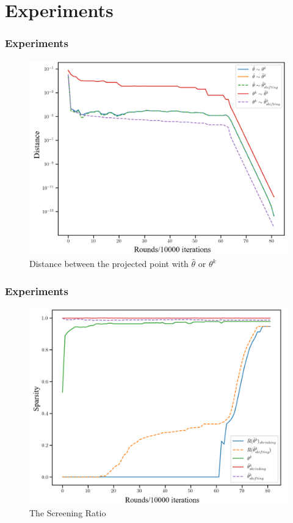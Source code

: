\documentclass[dvipdfmx,cjk,t,10pt]{beamer}
\begin{document}
\section{Experiments}
\begin{frame}
\frametitle{Experiments}
	\begin{figure}[htbp]
	\begin{center}	
	\includegraphics[width=0.8\hsize]{pic/dis}
	\caption{Distance between the projected point with $\hat{\theta}$ or $\theta^k$ }
	\end{center}	
	\end{figure}

\end{frame}


\begin{frame}
\frametitle{Experiments}
	\begin{figure}[htbp]
	\begin{center}	
	\includegraphics[width=0.8\hsize]{pic/spa}
	\caption{The Screening Ratio}
	\end{center}	
	\end{figure}

\end{frame}
\end{document}
